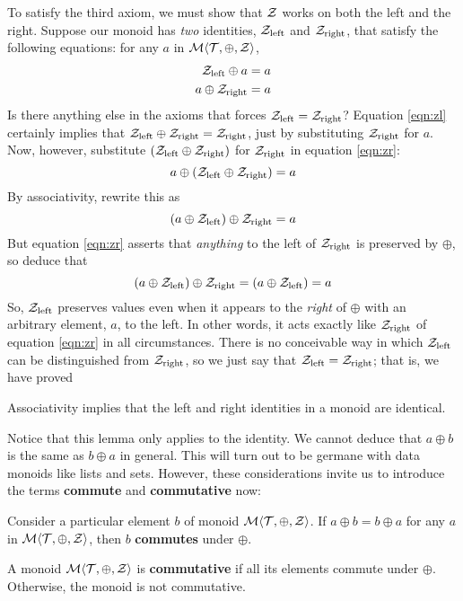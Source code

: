 To satisfy the third axiom, we must show that $\mathcal{Z}$ works on both the left and the right. Suppose our monoid has \emph{two} identities, $\mathcal{Z}_{\mathrm{left}}$ and $\mathcal{Z}_{\mathrm{right}}$, that satisfy the following equations: for any $a$ in $\mathcal{M}\langle{\mathcal{T}},{\oplus},{\mathcal{Z}}\rangle$, 
\begin{eqnarray}
	\label{eqn:zl}\mathcal{Z}_{\mathrm{left}}\oplus a=a\\
	\label{eqn:zr}a\oplus\mathcal{Z}_{\mathrm{right}}=a
\end{eqnarray}
Is there anything else in the axioms that forces $\mathcal{Z}_{\mathrm{left}}=\mathcal{Z}_{\mathrm{right}}$? Equation \ref{eqn:zl} certainly implies that $\mathcal{Z}_{\mathrm{left}}\oplus\mathcal{Z}_{\mathrm{right}}=\mathcal{Z}_{\mathrm{right}}$, just by substituting $\mathcal{Z}_{\mathrm{right}}$ for $a$. Now, however, substitute $(\mathcal{Z}_{\mathrm{left}}\oplus\mathcal{Z}_{\mathrm{right}})$ for $\mathcal{Z}_{\mathrm{right}}$ in equation \ref{eqn:zr}:
\begin{equation*} 
  a \oplus (\mathcal{Z}_{\mathrm{left}} \oplus \mathcal{Z}_{\mathrm{right}}) = a 
\end{equation*}
By associativity, rewrite this as
\begin{equation*} 
  (a \oplus \mathcal{Z}_{\mathrm{left}}) \oplus \mathcal{Z}_{\mathrm{right}} = a 
\end{equation*}
But equation \ref{eqn:zr} asserts that \emph{anything} to the left of $\mathcal{Z}_{\mathrm{right}}$ is preserved by $\oplus$, so deduce that
\begin{equation*} 
  (a \oplus \mathcal{Z}_{\mathrm{left}}) \oplus \mathcal{Z}_{\mathrm{right}} = (a \oplus \mathcal{Z}_{\mathrm{left}}) = a 
\end{equation*}
So, $\mathcal{Z}_{\mathrm{left}}$ preserves values even when it appears to the \emph{right} of $\oplus$ with an arbitrary element, $a$, to the left. In other words, it acts exactly like $\mathcal{Z}_{\mathrm{right}}$ of equation \ref{eqn:zr} in all circumstances. There is no conceivable way in which $\mathcal{Z}_{\mathrm{left}}$ can be distinguished from $\mathcal{Z}_{\mathrm{right}}$, so we just say that $\mathcal{Z}_{\mathrm{left}}=\mathcal{Z}_{\mathrm{right}}$; that is, we have proved
\begin{lemma}
  Associativity implies that the left and right identities in a monoid are identical.
\end{lemma}


Notice that this lemma only applies to the identity. We cannot deduce that $a\oplus b$ is the same as $b\oplus a$ in general. This will turn out to be germane with data monoids like lists and sets. However, these considerations invite us to introduce the terms \textbf{commute} and \textbf{commutative} now:

\begin{definition}
  Consider a particular element $b$ of monoid $\mathcal{M}\langle{\mathcal{T}},{\oplus},{\mathcal{Z}}\rangle$. If $a\oplus b = b\oplus a$ for any $a$ in $\mathcal{M}\langle{\mathcal{T}},{\oplus},{\mathcal{Z}}\rangle$, then $b$ \textbf{commutes} under $\oplus$.
\end{definition}

\begin{definition}
  A monoid $\mathcal{M}\langle{\mathcal{T}},{\oplus},{\mathcal{Z}}\rangle$ is \textbf{commutative} if all its elements commute under $\oplus$. Otherwise, the monoid is not commutative.
\end{definition}



